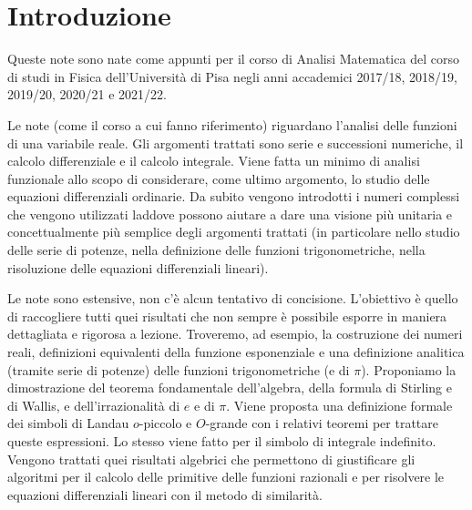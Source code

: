 \chapter*{Introduzione}


Queste note sono nate come appunti per il corso di Analisi Matematica %
del corso di studi in Fisica dell'Università %
di Pisa negli anni accademici 2017/18, 2018/19, 2019/20, 2020/21 e 2021/22. %

Le note (come il corso a cui fanno riferimento) %
riguardano l'analisi delle funzioni di una variabile %
reale. %
Gli argomenti trattati sono serie e successioni numeriche, %
il calcolo differenziale e il calcolo integrale. %
Viene fatta un minimo di analisi funzionale allo scopo di considerare, %
come ultimo argomento, lo studio delle equazioni differenziali ordinarie. %
Da subito vengono introdotti i numeri complessi che vengono utilizzati %
laddove possono aiutare a dare una visione più unitaria e concettualmente %
più semplice degli argomenti trattati (in particolare nello studio delle serie %
di potenze, nella definizione delle funzioni trigonometriche, nella risoluzione delle equazioni differenziali lineari). %

Le note sono estensive, non c'è alcun tentativo di concisione. %
L'obiettivo è quello di raccogliere tutti quei risultati che non sempre è %
possibile esporre in maniera dettagliata e rigorosa a lezione. %
Troveremo, ad esempio, %
la costruzione dei numeri reali,
definizioni equivalenti della funzione esponenziale e una definizione %
analitica (tramite serie di potenze) %
delle funzioni trigonometriche (e di $\pi$). %
Proponiamo la dimostrazione del teorema fondamentale dell'algebra, %
della formula di Stirling e di Wallis, %
e dell'irrazionalità di $e$ e di $\pi$. %
Viene proposta una definizione formale dei simboli di Landau %
$o$-piccolo e $O$-grande con i relativi teoremi per trattare queste espressioni. %
Lo stesso viene fatto per il simbolo di integrale indefinito. %
Vengono trattati quei risultati algebrici che permettono di %
giustificare gli algoritmi per il calcolo delle primitive %
delle funzioni razionali e per risolvere le equazioni differenziali %
lineari con il metodo di similarità. %

